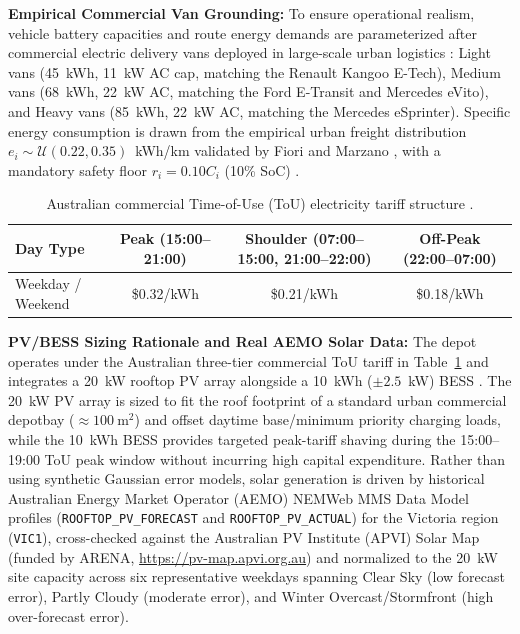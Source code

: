 \documentclass[final,3p,times,twocolumn]{elsarticle}
\begin{document}
\textbf{Empirical Commercial Van Grounding:} To ensure operational realism, vehicle battery capacities and route energy demands are parameterized after commercial electric delivery vans deployed in large-scale urban logistics \cite{vales2026emergent,fiori2018modelling}: Light vans (45~kWh, 11~kW AC cap, matching the Renault Kangoo E-Tech), Medium vans (68~kWh, 22~kW AC, matching the Ford E-Transit and Mercedes eVito), and Heavy vans (85~kWh, 22~kW AC, matching the Mercedes eSprinter). Specific energy consumption is drawn from the empirical urban freight distribution $e_i \sim \mathcal{U}(0.22, 0.35)$~kWh/km validated by Fiori and Marzano \cite{fiori2018modelling}, with a mandatory safety floor $r_i = 0.10 C_i$ (10\% SoC) \cite{vales2026emergent}.

\begin{table}[htbp]
\centering
\caption{Australian commercial Time-of-Use (ToU) electricity tariff structure \cite{nimalsiri2021coordinated}.}
\label{tab:tou}
\footnotesize
\begin{tabular}{lccc}
\toprule
Day Type & Peak (15:00--21:00) & Shoulder (07:00--15:00, 21:00--22:00) & Off-Peak (22:00--07:00) \\
\midrule
Weekday / Weekend & \$0.32/kWh & \$0.21/kWh & \$0.18/kWh \\
\bottomrule
\end{tabular}
\end{table}

\textbf{PV/BESS Sizing Rationale and Real AEMO Solar Data:} The depot operates under the Australian three-tier commercial ToU tariff in Table~\ref{tab:tou} \cite{nimalsiri2021coordinated} and integrates a 20~kW rooftop PV array alongside a 10~kWh ($\pm 2.5$~kW) BESS \cite{ratnam2015scheduling,teng2020technical}. The 20~kW PV array is sized to fit the roof footprint of a standard urban commercial depotbay ($\approx 100~\text{m}^2$) and offset daytime base/minimum priority charging loads, while the 10~kWh BESS provides targeted peak-tariff shaving during the 15:00--19:00 ToU peak window without incurring high capital expenditure. Rather than using synthetic Gaussian error models, solar generation is driven by historical Australian Energy Market Operator (AEMO) NEMWeb MMS Data Model profiles (\texttt{ROOFTOP\_PV\_FORECAST} and \texttt{ROOFTOP\_PV\_ACTUAL}) for the Victoria region (\texttt{VIC1}), cross-checked against the Australian PV Institute (APVI) Solar Map (funded by ARENA, \url{https://pv-map.apvi.org.au}) and normalized to the 20~kW site capacity across six representative weekdays spanning Clear Sky (low forecast error), Partly Cloudy (moderate error), and Winter Overcast/Stormfront (high over-forecast error).
\end{document}
